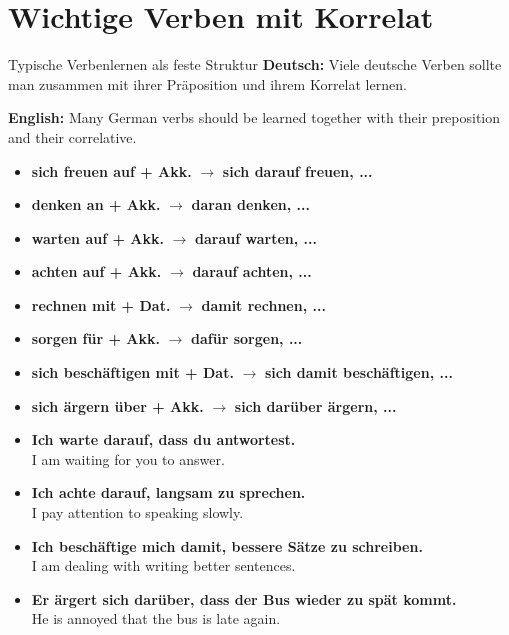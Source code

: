 \documentclass[a4paper,11pt]{article}
\newcommand{\GermanText}[1]{\textbf{Deutsch: }#1\par}
\newcommand{\EnglishText}[1]{{\small\color{SoftGray}\textbf{English: }#1\par}}
\newcommand{\ExampleItem}[2]{\item \textbf{#1}\\{\small\color{SoftGray}#2}}
\begin{document}
    
    \section{Wichtige Verben mit Korrelat}
        
        \begin{grammarentry}{Typische Verben}{lernen als feste Struktur}
            \GermanText{Viele deutsche Verben sollte man zusammen mit ihrer Präposition und ihrem Korrelat lernen.}
            \EnglishText{Many German verbs should be learned together with their preposition and their correlative.}
            
            \begin{itemize}
                \item \textbf{sich freuen auf + Akk.} $\rightarrow$ \textbf{sich darauf freuen, ...}
                \item \textbf{denken an + Akk.} $\rightarrow$ \textbf{daran denken, ...}
                \item \textbf{warten auf + Akk.} $\rightarrow$ \textbf{darauf warten, ...}
                \item \textbf{achten auf + Akk.} $\rightarrow$ \textbf{darauf achten, ...}
                \item \textbf{rechnen mit + Dat.} $\rightarrow$ \textbf{damit rechnen, ...}
                \item \textbf{sorgen für + Akk.} $\rightarrow$ \textbf{dafür sorgen, ...}
                \item \textbf{sich beschäftigen mit + Dat.} $\rightarrow$ \textbf{sich damit beschäftigen, ...}
                \item \textbf{sich ärgern über + Akk.} $\rightarrow$ \textbf{sich darüber ärgern, ...}
            \end{itemize}
        \end{grammarentry}
        
        \begin{exbox}
            \begin{itemize}
                \ExampleItem{Ich warte darauf, dass du antwortest.}{I am waiting for you to answer.}
                \ExampleItem{Ich achte darauf, langsam zu sprechen.}{I pay attention to speaking slowly.}
                \ExampleItem{Ich beschäftige mich damit, bessere Sätze zu schreiben.}{I am dealing with writing better sentences.}
                \ExampleItem{Er ärgert sich darüber, dass der Bus wieder zu spät kommt.}{He is annoyed that the bus is late again.}
            \end{itemize}
        \end{exbox}
    
\end{document}
